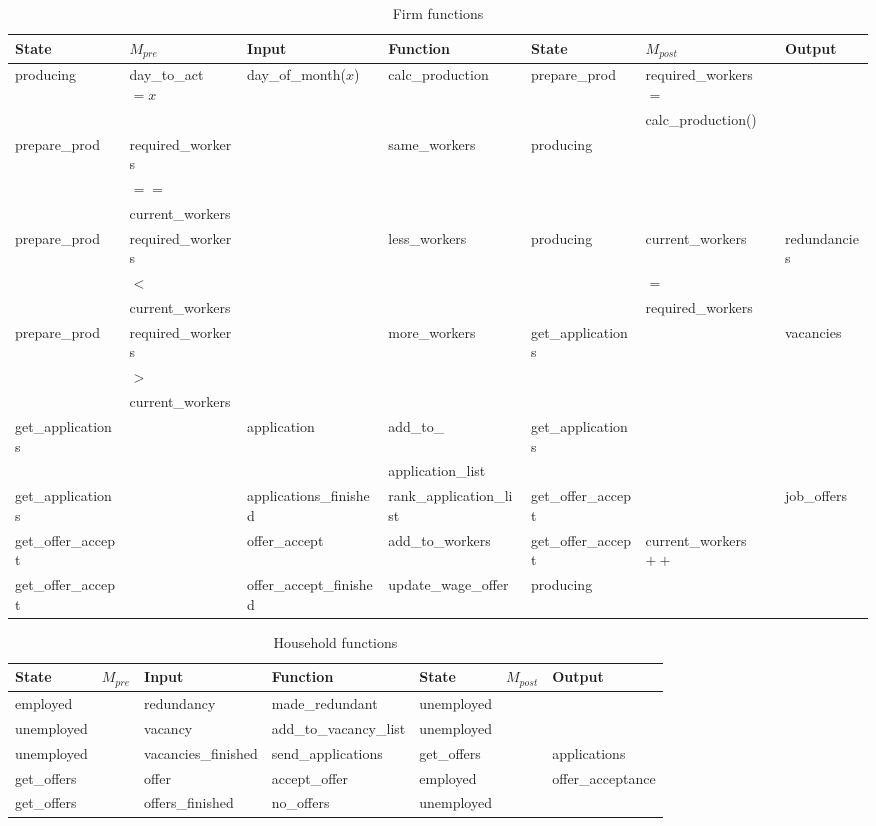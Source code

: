 \documentclass[a4paper,11pt]{article}
\begin{document}
\begin{landscape}
\begin{table}[tbp]
\centering
\begin{tabular}{|l|l|l||l||l|l|l|}
\hline
State&$M_{pre}$&Input&Function&State&$M_{post}$&Output\\
\hline
\hline
producing&day\_to\_act $= x$&day\_of\_month($x$)&calc\_production&prepare\_prod&required\_workers $=$&\\
&&&&&calc\_production()&\\
\hline
prepare\_prod&required\_workers&&same\_workers&producing&&\\
&$==$&&&&&\\
&current\_workers&&&&&\\
\hline
prepare\_prod&required\_workers&&less\_workers&producing&current\_workers&redundancies\\
&$<$&&&&$=$&\\
&current\_workers&&&&required\_workers&\\
\hline
prepare\_prod&required\_workers&&more\_workers&get\_applications&&vacancies\\
&$>$&&&&&\\
&current\_workers&&&&&\\
\hline
get\_applications&&application&add\_to\_&get\_applications&&\\
&&&application\_list&&&\\
\hline
get\_applications&&applications\_finished&rank\_application\_list&get\_offer\_accept&&job\_offers\\
\hline
get\_offer\_accept&&offer\_accept&add\_to\_workers&get\_offer\_accept&current\_workers$++$&\\
\hline
get\_offer\_accept&&offer\_accept\_finished&update\_wage\_offer&producing&&\\
\hline
\end{tabular}
\caption{Firm functions}
\label{tab:firmfunctions}
\end{table}
\end{landscape}

\begin{landscape}
\begin{table}[tbp]
\centering
\begin{tabular}{|l|l|l||l||l|l|l|}
\hline
State&$M_{pre}$&Input&Function&State&$M_{post}$&Output\\
\hline
\hline
employed&&redundancy&made\_redundant&unemployed&&\\
\hline
unemployed&&vacancy&add\_to\_vacancy\_list&unemployed&&\\
\hline
unemployed&&vacancies\_finished&send\_applications&get\_offers&&applications\\
\hline
get\_offers&&offer&accept\_offer&employed&&offer\_acceptance\\
\hline
get\_offers&&offers\_finished&no\_offers&unemployed&&\\
\hline
\end{tabular}
\caption{Household functions}
\label{tab:householdfunctions}
\end{table}
\end{landscape}
\end{document}
